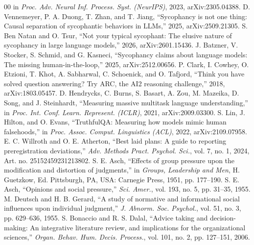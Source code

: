 \documentclass{ieeeaccess}
\begin{document}
\begin{thebibliography}{00}
in \emph{Proc. Adv. Neural Inf. Process. Syst. (NeurIPS)}, 2023, arXiv:2305.04388.
 D. Vennemeyer, P. A. Duong, T. Zhan, and T. Jiang, ``Sycophancy is
not one thing: Causal separation of sycophantic behaviors in LLMs,'' 2025, arXiv:2509.21305.
 S. Ben Natan and O. Tsur, ``Not your typical sycophant: The elusive
nature of sycophancy in large language models,'' 2026, arXiv:2601.15436.
 J. Batzner, V. Stocker, S. Schmid, and G. Kasneci, ``Sycophancy claims
about language models: The missing human-in-the-loop,'' 2025, arXiv:2512.00656.
 P. Clark, I. Cowhey, O. Etzioni, T. Khot, A. Sabharwal, C. Schoenick, and
O. Tafjord, ``Think you have solved question answering? Try ARC, the AI2 reasoning
challenge,'' 2018, arXiv:1803.05457.
 D. Hendrycks, C. Burns, S. Basart, A. Zou, M. Mazeika, D. Song, and
J. Steinhardt, ``Measuring massive multitask language understanding,'' in \emph{Proc. Int.
Conf. Learn. Represent. (ICLR)}, 2021, arXiv:2009.03300.
 S. Lin, J. Hilton, and O. Evans, ``TruthfulQA: Measuring how models mimic
human falsehoods,'' in \emph{Proc. Assoc. Comput. Linguistics (ACL)}, 2022, arXiv:2109.07958.
 E. C. Willroth and O. E. Atherton, ``Best laid plans: A guide to
reporting preregistration deviations,'' \emph{Adv. Methods Pract. Psychol. Sci.}, vol. 7,
no. 1, 2024, Art. no. 25152459231213802.
 S. E. Asch, ``Effects of group pressure upon the modification and
distortion of judgments,'' in \emph{Groups, Leadership and Men}, H. Guetzkow, Ed.
Pittsburgh, PA, USA: Carnegie Press, 1951, pp. 177--190.
 S. E. Asch, ``Opinions and social pressure,'' \emph{Sci. Amer.},
vol. 193, no. 5, pp. 31--35, 1955.
 M. Deutsch and H. B. Gerard, ``A study of normative and
informational social influences upon individual judgment,'' \emph{J. Abnorm. Soc. Psychol.},
vol. 51, no. 3, pp. 629--636, 1955.
 S. Bonaccio and R. S. Dalal, ``Advice taking and decision-making: An
integrative literature review, and implications for the organizational sciences,''
\emph{Organ. Behav. Hum. Decis. Process.}, vol. 101, no. 2, pp. 127--151, 2006.
\end{thebibliography}


\EOD
\end{document}
